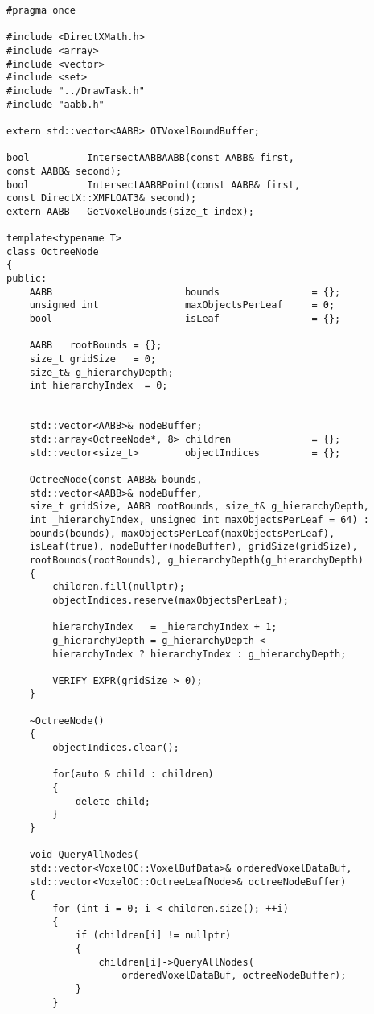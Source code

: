 \begin{lstlisting}
#pragma once

#include <DirectXMath.h>
#include <array>
#include <vector>
#include <set>
#include "../DrawTask.h"
#include "aabb.h"

extern std::vector<AABB> OTVoxelBoundBuffer;

bool          IntersectAABBAABB(const AABB& first, 
const AABB& second);
bool          IntersectAABBPoint(const AABB& first, 
const DirectX::XMFLOAT3& second);
extern AABB   GetVoxelBounds(size_t index);

template<typename T>
class OctreeNode
{
public:
    AABB                       bounds                = {};
    unsigned int               maxObjectsPerLeaf     = 0;
    bool                       isLeaf                = {};

    AABB   rootBounds = {};
    size_t gridSize   = 0;
    size_t& g_hierarchyDepth;
    int hierarchyIndex  = 0;


    std::vector<AABB>& nodeBuffer;
    std::array<OctreeNode*, 8> children              = {};
    std::vector<size_t>        objectIndices         = {};

    OctreeNode(const AABB& bounds, 
    std::vector<AABB>& nodeBuffer, 
    size_t gridSize, AABB rootBounds, size_t& g_hierarchyDepth, 
    int _hierarchyIndex, unsigned int maxObjectsPerLeaf = 64) :
    bounds(bounds), maxObjectsPerLeaf(maxObjectsPerLeaf), 
    isLeaf(true), nodeBuffer(nodeBuffer), gridSize(gridSize), 
    rootBounds(rootBounds), g_hierarchyDepth(g_hierarchyDepth)
    {
        children.fill(nullptr);
        objectIndices.reserve(maxObjectsPerLeaf);

        hierarchyIndex   = _hierarchyIndex + 1;
        g_hierarchyDepth = g_hierarchyDepth < 
        hierarchyIndex ? hierarchyIndex : g_hierarchyDepth;

        VERIFY_EXPR(gridSize > 0);
    }

    ~OctreeNode()
    {
        objectIndices.clear();
        
        for(auto & child : children)
        {
            delete child;
        }
    }

    void QueryAllNodes(
    std::vector<VoxelOC::VoxelBufData>& orderedVoxelDataBuf, 
    std::vector<VoxelOC::OctreeLeafNode>& octreeNodeBuffer)
    {
        for (int i = 0; i < children.size(); ++i)
        {
            if (children[i] != nullptr)
            {                
                children[i]->QueryAllNodes(
                    orderedVoxelDataBuf, octreeNodeBuffer);
            }
        }


\end{lstlisting}
